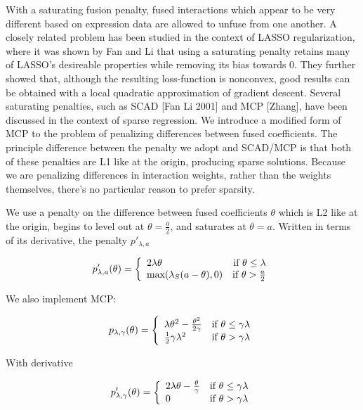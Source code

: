 \documentclass[11pt]{article}
\begin{document}
With a saturating fusion penalty, fused interactions which appear to be very different based on expression data are allowed to unfuse from one another. A closely related problem has been studied in the context of LASSO regularization, where it was shown by Fan and Li that using a saturating penalty retains many of LASSO's desireable properties while removing its bias towards 0. They further showed that, although the resulting loss-function is nonconvex, good results can be obtained with a local quadratic approximation of gradient descent. Several saturating penalties, such as SCAD [Fan Li 2001] and MCP [Zhang], have been discussed in the context of sparse regression. We introduce a modified form of MCP to the problem of penalizing differences between fused coefficients. The principle difference between the penalty we adopt and SCAD/MCP is that both of these penalties are L1 like at the origin, producing sparse solutions. Because we are penalizing differences in interaction weights, rather than the weights themselves, there's no particular reason to prefer sparsity. 

We use a penalty on the difference between fused coefficients $\theta$ which is L2 like at the origin, begins to level out at $\theta = \frac{a}{2}$, and saturates at $\theta = a$. Written in terms of its derivative, the penalty $p'_{\lambda, a}$

\begin{equation}
p'_{\lambda,a}(\theta) = \left\{
    \begin{array}{lr}
    2\lambda\theta & \text{if } \theta \leq \lambda\\
    \text{max}(\lambda_S(a-\theta),0) & \text{if } \theta > {a \over 2}
    \end{array}
    \right.
\end{equation}

We also implement MCP:

\begin{equation}
p_{\lambda,\gamma}(\theta) = \left\{
    \begin{array}{lr}
    \lambda\theta^2-{ \theta^2 \over 2\gamma} & \text{if } \theta \leq \gamma\lambda\\
    {1 \over 2}\gamma\lambda^2 & \text{if } \theta > \gamma\lambda
    \end{array}
    \right. 
\end{equation}

With derivative

\begin{equation}
p'_{\lambda,\gamma}(\theta) = \left\{
    \begin{array}{lr}
    2\lambda\theta - {\theta \over \gamma} & \text{if } \theta \leq \gamma\lambda\\
    0 & \text{if } \theta > \gamma\lambda
    \end{array}
    \right.
\end{equation}
\end{document}
